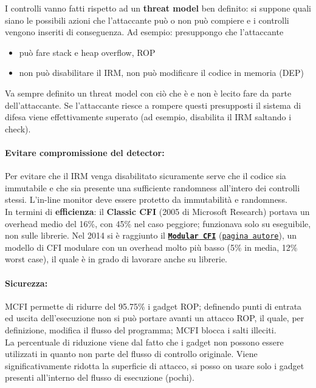 I controlli vanno fatti rispetto ad un \textbf{threat model} ben definito: si suppone quali siano le possibili azioni che l'attaccante può o non può compiere e i controlli vengono inseriti di conseguenza. Ad esempio: presuppongo che l'attaccante 
\begin{itemize}
	\item può fare stack e heap overflow, ROP
	\item non può disabilitare il IRM, non può modificare il codice in memoria (DEP)
\end{itemize}

Va sempre definito un threat model con ciò che è e non è lecito fare da parte dell'attaccante. Se l'attaccante riesce a rompere questi presupposti il sistema di difesa viene effettivamente superato (ad esempio, disabilita il IRM saltando i check).\\

\paragraph{Evitare compromissione del detector:} Per evitare che il IRM venga disabilitato sicuramente serve che il codice sia immutabile e che sia presente una sufficiente randomness all'intero dei controlli stessi. L'in-line monitor deve essere protetto da immutabilità e randomness.\\

In termini di \textbf{efficienza}: il \textbf{Classic CFI} (2005 di Microsoft Research) portava un overhead medio del 16\%, con 45\% nel caso peggiore; funzionava solo su eseguibile, non sulle librerie. Nel 2014 si è raggiunto il \href{https://www.cse.psu.edu/~gxt29/papers/mcfi.pdf}{\textbf{\texttt{Modular CFI}}} (\href{https://www.cse.psu.edu/~gxt29/}{\texttt{pagina autore}}), un modello di CFI modulare con un overhead molto più basso (5\% in media, 12\% worst case), il quale è in grado di lavorare anche su librerie.\\

\paragraph{Sicurezza:} MCFI permette di ridurre del 95.75\% i gadget ROP; definendo punti di entrata ed uscita dell'esecuzione non si può portare avanti un attacco ROP, il quale, per definizione, modifica il flusso del programma; MCFI blocca i salti illeciti. \\

La percentuale di riduzione viene dal fatto che i gadget non possono essere utilizzati in quanto non parte del flusso di controllo originale. Viene significativamente ridotta la superficie di attacco, si posso on usare solo i gadget presenti all'interno del flusso di esecuzione (pochi).\\

